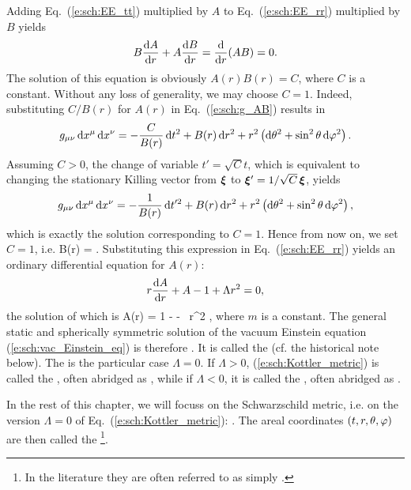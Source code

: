 Adding Eq.~(\ref{e:sch:EE_tt}) multiplied by $A$ to
Eq.~(\ref{e:sch:EE_rr}) multiplied by $B$ yields
\[
    B \frac{\mathrm{d} A}{\mathrm{d} r} + A \frac{\mathrm{d} B}{\mathrm{d} r} = \frac{\mathrm{d} }{\mathrm{d} r}(AB) = 0 .
\]
The solution of this equation is obviously $A(r)B(r) = C$, where $C$ is a constant.
Without any loss of generality, we may choose $C=1$. Indeed, substituting
$C/B(r)$ for $A(r)$ in Eq.~(\ref{e:sch:g_AB}) results in
\[
    g_{\mu\nu}\, \mathrm{d} x^\mu \, \mathrm{d} x^\nu = -\frac{C}{B(r)}\, \mathrm{d} t^2 + B(r)\, \mathrm{d} r^2 +
        r^2 \left( \mathrm{d}\theta^2 + \sin^2\theta\, \mathrm{d}\varphi^2 \right) .
\]
Assuming $C>0$, the change of variable $t' = \sqrt{C} t$, which is equivalent
to changing the stationary Killing vector from $\bm{\xi}$ to
$\bm{\xi}'=  1/\sqrt{C}\, \bm{\xi}$,
yields
\[
    g_{\mu\nu}\, \mathrm{d} x^\mu \, \mathrm{d} x^\nu = -\frac{1}{B(r)}\, \mathrm{d} t'^2 + B(r)\, \mathrm{d} r^2 +
        r^2 \left( \mathrm{d}\theta^2 + \sin^2\theta\, \mathrm{d}\varphi^2 \right) ,
\]
which is exactly the solution corresponding to $C=1$. Hence from now on,
we set $C=1$, i.e.
\be
    B(r) =  .
\ee
Substituting this expression in Eq.~(\ref{e:sch:EE_rr}) yields an ordinary
differential equation for $A(r)$:
\[
    r \frac{\mathrm{d} A}{\mathrm{d} r} + A - 1 + \Lambda r^2 = 0 ,
\]
the solution of which is
\be
    A(r) = 1 -  -  \,  r^2 ,
\ee
where $m$ is a constant.
The general static and spherically symmetric solution of the vacuum
Einstein equation (\ref{e:sch:vac_Einstein_eq}) is therefore
\be \label{e:sch:Kottler_metric}
    .
\ee
It is called the  (cf. the historical
note below).
The   is the
particular case $\Lambda=0$. If $\Lambda>0$,
(\ref{e:sch:Kottler_metric}) is called the
,
often abridged as , while if $\Lambda<0$, it
is called the ,
often abridged as .

In the rest of this chapter, we will focuss on the Schwarzschild metric,
i.e. on the version $\Lambda=0$ of Eq.~(\ref{e:sch:Kottler_metric}):
\be \label{e:sch:Schwarz_metric_SD}
    .
\ee
The areal coordinates $(t,r,\theta,\varphi)$ are then called the
\footnote{In the literature they are often referred to as simply
.}.

